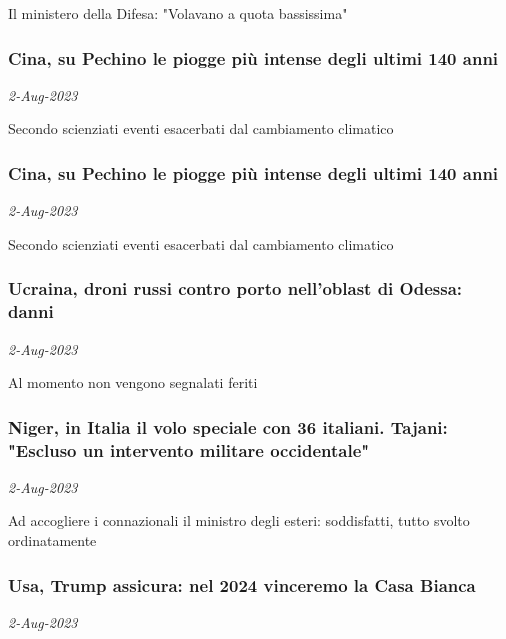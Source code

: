 Il ministero della Difesa: "Volavano a quota bassissima"
\subsubsection{Cina, su Pechino le piogge pi\`{u} intense degli ultimi 140 anni \href{https://www.ansa.it/sito/notizie/mondo/2023/08/02/cina-su-pechino-le-piogge-piu-intense-degli-ultimi-140-anni_b6f04505-c7b4-43a3-a495-dc3cc86e99c5.html}{}}
\textit{2-Aug-2023}

Secondo scienziati eventi esacerbati dal cambiamento climatico
\subsubsection{Cina, su Pechino le piogge pi\`{u} intense degli ultimi 140 anni \href{https://www.ansa.it/sito/notizie/mondo/asia/2023/08/02/cina-su-pechino-le-piogge-piu-intense-degli-ultimi-140-anni_31f935b9-d519-429d-976f-ed7682521561.html}{}}
\textit{2-Aug-2023}

Secondo scienziati eventi esacerbati dal cambiamento climatico
\subsubsection{Ucraina, droni russi contro porto nell'oblast di Odessa: danni \href{https://www.ansa.it/sito/notizie/mondo/europa/2023/08/02/ucraina-droni-russi-contro-porto-nelloblast-di-odessa-danni_93b32da8-1499-4cc2-8e0f-6e7d6232b044.html}{}}
\textit{2-Aug-2023}

Al momento non vengono segnalati feriti
\subsubsection{Niger, in Italia il volo speciale con 36 italiani. Tajani: "Escluso un intervento militare occidentale" \href{https://www.ansa.it/sito/notizie/mondo/africa/2023/08/02/niger-atterrato-a-ciampino-il-volo-speciale-con-36-italiani_2ff925ca-371d-4534-8d2d-0a9afa2fb4c4.html}{}}
\textit{2-Aug-2023}

Ad accogliere i connazionali il ministro degli esteri: soddisfatti, tutto svolto ordinatamente
\subsubsection{Usa, Trump assicura: nel 2024 vinceremo la Casa Bianca \href{https://www.ansa.it/sito/notizie/mondo/nordamerica/2023/08/02/usa-trump-assicura-nel-2024-vinceremo-la-casa-bianca_91ad5a88-6836-40ad-8ebb-d3f3146aae73.html}{}}
\textit{2-Aug-2023}

